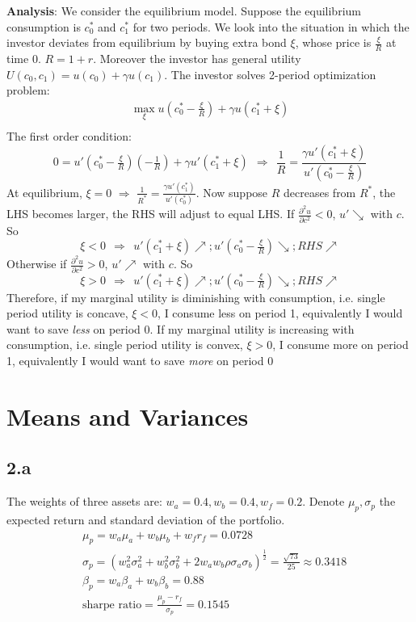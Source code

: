 \documentclass[10 pt]{hwtemplate} %
\begin{document}
\noindent\textbf{Analysis}:
We consider the equilibrium model. Suppose the equilibrium consumption is $c_0^*$ and $c_1^*$ for two periods. We look into the situation in which the investor deviates from equilibrium by buying extra bond $\xi$, whose price is $\frac{\xi}{R}$ at time 0. $R=1+r$. Moreover the investor has general utility $U(c_0, c_1) = u(c_0) + \gamma u(c_1)$.
The investor solves 2-period optimization problem:
\begin{equation}
  \begin{split}
  \max\limits_{\xi} u(c_0^*-\tfrac{\xi}{R}) + \gamma u(c_1^*+\xi) \\
  \end{split}
\end{equation}
The first order condition:
\begin{equation}
  0 = u'(c_0^*-\tfrac{\xi}{R})(-\tfrac{1}{R}) + \gamma u'(c_1^*+\xi)~~\Rightarrow~~\frac{1}{R}=\frac{\gamma u'(c_1^*+\xi)}{u'(c_0^*-\tfrac{\xi}{R})}
\end{equation}
At equilibrium, $\xi=0$ $\Rightarrow$ $\frac{1}{R^*}= \frac{\gamma u'(c_1^*)}{u'(c_0^*)}$. Now suppose $R$ decreases from $R^*$, the LHS becomes larger, the RHS will adjust to equal LHS. If $\frac{\partial^2 u}{\partial c^2}<0$, $u'\searrow$ with $c$. So
$$
    \xi<0~~ \Rightarrow ~~u'(c_1^*+\xi)\nearrow; u'(c_0^*-\tfrac{\xi}{R}) \searrow; RHS\nearrow
$$
Otherwise if $\frac{\partial^2 u}{\partial c^2}>0$, $u'\nearrow$ with $c$. So
$$
    \xi>0~~ \Rightarrow ~~u'(c_1^*+\xi)\nearrow; u'(c_0^*-\tfrac{\xi}{R}) \searrow; RHS\nearrow
$$
Therefore, if my marginal utility is diminishing with consumption, i.e. single period utility is concave, $\xi<0$, I consume less on period 1, equivalently I would want to save \textit{less} on period 0. If my marginal utility is increasing with consumption, i.e. single period utility is convex, $\xi>0$, I consume more on period 1, equivalently I would want to save \textit{more} on period 0


\section{Means and Variances}
\subsection*{2.a} The weights of three assets are: $w_a=0.4, w_b=0.4, w_f=0.2$. Denote $\mu_p, \sigma_p$ the expected return and standard deviation of the portfolio. 
\begin{equation}
  \begin{split}
    &\mu_{p} = w_a\mu_a + w_b\mu_b + w_fr_f = 0.0728 \\
    &\sigma_p = \left(w_a^2\sigma_a^2  + w_b^2\sigma_b^2  + 2w_aw_b\rho \sigma_a \sigma_b\right)^{\frac{1}{2}} = \tfrac{\sqrt{73}}{25} \approx 0.3418 \\
    &\beta_p = w_a\beta_a + w_b\beta_b = 0.88\\
    &\text{sharpe ratio} = \frac{\mu_p - r_f}{\sigma_p} = 0.1545
  \end{split}
\end{equation}
\end{document}
